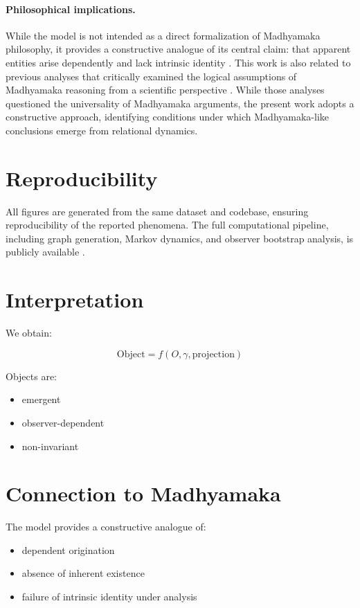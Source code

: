 \documentclass[11pt]{article}
\begin{document}
\paragraph{Philosophical implications.}
While the model is not intended as a direct formalization of Madhyamaka philosophy, 
it provides a constructive analogue of its central claim: 
that apparent entities arise dependently and lack intrinsic identity \cite{nagarjuna, tsongkhapa}.
This work is also related to previous analyses that critically examined the logical assumptions of Madhyamaka reasoning from a scientific perspective \cite{madhyamaka_critique}. While those analyses questioned the universality of Madhyamaka arguments, the present work adopts a constructive approach, identifying conditions under which Madhyamaka-like conclusions emerge from relational dynamics.
\section{Reproducibility}

All figures are generated from the same dataset and codebase, ensuring reproducibility of the reported phenomena.
The full computational pipeline, including graph generation, Markov dynamics, and observer bootstrap analysis, is publicly available \cite{code_repo}.

\section{Interpretation}

We obtain:

\begin{equation}
\text{Object} = f(O, \gamma, \text{projection})
\end{equation}

Objects are:

\begin{itemize}
    \item emergent
    \item observer-dependent
    \item non-invariant
\end{itemize}

\section{Connection to Madhyamaka}

The model provides a constructive analogue of:

\begin{itemize}
    \item dependent origination
    \item absence of inherent existence
    \item failure of intrinsic identity under analysis
\end{itemize}
\end{document}
